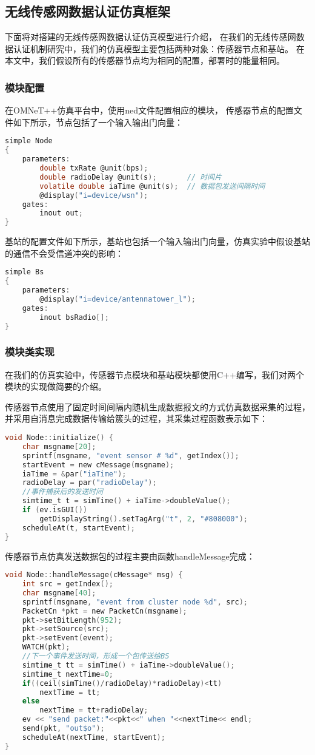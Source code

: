 \subsection{无线传感网数据认证仿真框架}
下面将对搭建的无线传感网数据认证仿真模型进行介绍，
在我们的无线传感网数据认证机制研究中，我们的仿真模型主要包括两种对象：传感器节点和基站。
在本文中，我们假设所有的传感器节点均为相同的配置，部署时的能量相同。

\subsubsection{模块配置}
在OMNeT++仿真平台中，使用ned文件配置相应的模块，
传感器节点的配置文件如下所示，节点包括了一个输入输出门向量：
\begin{lstlisting}[language=C]
simple Node
{
    parameters:
        double txRate @unit(bps);
        double radioDelay @unit(s);       // 时间片
        volatile double iaTime @unit(s);  // 数据包发送间隔时间
        @display("i=device/wsn");
    gates:
        inout out;
}
\end{lstlisting}
基站的配置文件如下所示，基站也包括一个输入输出门向量，仿真实验中假设基站的通信不会受信道冲突的影响：
\begin{lstlisting}[language=C]
simple Bs
{
    parameters:
        @display("i=device/antennatower_l");
    gates:
        inout bsRadio[];
}
\end{lstlisting}
\subsubsection{模块类实现}
在我们的仿真实验中，传感器节点模块和基站模块都使用C++编写，我们对两个模块的实现做简要的介绍。

传感器节点使用了固定时间间隔内随机生成数据报文的方式仿真数据采集的过程，并采用自消息完成数据传输给簇头的过程，其采集过程函数表示如下：
\begin{lstlisting}[language=C]
void Node::initialize() {
    char msgname[20];
    sprintf(msgname, "event sensor # %d", getIndex());
    startEvent = new cMessage(msgname);
    iaTime = &par("iaTime");
    radioDelay = par("radioDelay");
    //事件捕获后的发送时间
    simtime_t t = simTime() + iaTime->doubleValue();
    if (ev.isGUI())
        getDisplayString().setTagArg("t", 2, "#808000");
    scheduleAt(t, startEvent);
}
\end{lstlisting}

传感器节点仿真发送数据包的过程主要由函数handleMessage完成：
\begin{lstlisting}[language=C]
void Node::handleMessage(cMessage* msg) {
    int src = getIndex();
    char msgname[40];
    sprintf(msgname, "event from cluster node %d", src);
    PacketCn *pkt = new PacketCn(msgname);
    pkt->setBitLength(952);
    pkt->setSource(src);
    pkt->setEvent(event);
    WATCH(pkt);
    //下一个事件发送时间，形成一个包传送给BS
    simtime_t tt = simTime() + iaTime->doubleValue();
    simtime_t nextTime=0;
    if((ceil(simTime()/radioDelay)*radioDelay)<tt)
        nextTime = tt;
    else
        nextTime = tt+radioDelay;
    ev << "send packet:"<<pkt<<" when "<<nextTime<< endl;
    send(pkt, "out$o");
    scheduleAt(nextTime, startEvent);
}
\end{lstlisting}

